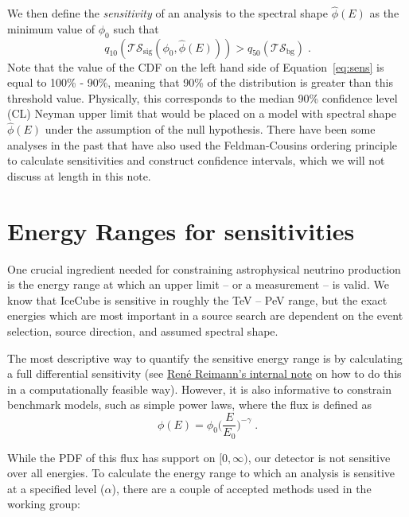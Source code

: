 \documentclass[a4paper,11pt]{article}
\newcommand\ts{\mathcal{TS}}
\newcommand\tsbg{\mathcal{TS_{\mathrm{bg}}}}
\begin{document}
We then define the \textit{sensitivity} of an analysis to the spectral shape $\hat{\phi}(E)$ as the minimum value of $\phi_0$ such that 
\begin{equation}
\label{eq:sens}
    q_{10}(\ts_{\mathrm{sig}}(\phi_0, \hat{\phi}(E))) > q_{50}(\tsbg) \; .
\end{equation}
Note that the value of the CDF on the left hand side of Equation~\ref{eq:sens} is equal to 100\% - 90\%, meaning that 90\% of the distribution is greater than this threshold value. Physically, this corresponds to the median 90\% confidence level (CL) Neyman upper limit that would be placed on a model with spectral shape $\hat{\phi}(E)$ under the assumption of the null hypothesis. There have been some analyses in the past that have also used the Feldman-Cousins ordering principle to calculate sensitivities and construct confidence intervals, which we will not discuss at length in this note.

\section{Energy Ranges for sensitivities}
\label{sec:energy_range}
One crucial ingredient needed for constraining astrophysical neutrino production is the energy range at which an upper limit -- or a measurement -- is valid. We know that IceCube is sensitive in roughly the TeV -- PeV range, but the exact energies which are most important in a source search are dependent on the event selection, source direction, and assumed spectral shape.

The most descriptive way to quantify the sensitive energy range is by calculating a full differential sensitivity (see \href{https://internal-apps.icecube.wisc.edu/reports/details.php?type=report&id=icecube\%2F201910002}{Ren\'{e} Reimann's internal note} \cite{Rene:differential} on how to do this in a computationally feasible way). However, it is also informative to constrain benchmark models, such as simple power laws, where the flux is defined as 
\begin{equation}
     \phi(E) = \phi_0 \Big(\frac{E}{E_0}\Big)^{-\gamma} \; .
\end{equation}

While the PDF of this flux has support on $[0, \infty)$, our detector is not sensitive over all energies. To calculate the energy range to which an analysis is sensitive at a specified level ($\alpha$), there are a couple of accepted methods used in the working group:
\end{document}
